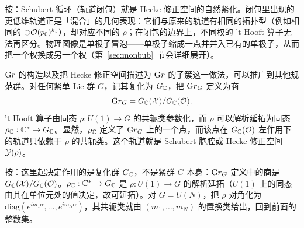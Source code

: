 \begin{yizhu}[物理图像]
按：Schubert 循环（轨道闭包）就是 Hecke 修正空间的自然紧化。闭包里出现的更低维轨道正是「混合」的几何表现：它们与原来的轨道有相同的拓扑型（例如相同的 $\oplus\cO(p_0)^{k_i}$），却对应不同的 $\rho$；在闭包的边界上，不同权的 't Hooft 算子无法再区分。物理图像是单极子冒泡——单极子缩成一点并并入已有的单极子，从而把一个权换成另一个权（第~\ref{sec:monbub}~节会详细展开）。
\end{yizhu}

${\rm Gr}$ 的构造以及把 Hecke 修正空间描述为 ${\rm Gr}$ 的子簇这一做法，可以推广到其他规范群。对任何紧单 Lie 群 $G$，记其复化为 $G_{\Bbb{C}}$，把 ${\rm Gr}_G$ 定义为商 %
\setcounter{equation}{33}
\begin{equation}\label{eq:hxonoh}
{\rm Gr}_G=G_{\Bbb{C}}({\cal
X})/G_{\Bbb{C}}(\cO).
\end{equation}
't Hooft 算子由同态 $\rho: U(1)\to G$ 的共轭类参数化，而 $\rho$ 可以解析延拓为同态 $\rho_\CC: \CC^*\to G_{\Bbb{C}}$。显然，$\rho_\CC$ 定义了 ${\rm Gr}_G$ 上的一个点，而该点在 $G_{\Bbb{C}}(\cO)$ 左作用下的轨道只依赖于 $\rho$ 的共轭类。这个轨道就是 Schubert 胞腔或 Hecke 修正空间 ${{\EUY}}(\rho)$。

\begin{yizhu}[易错点]
按：这里起决定作用的是复化群 $G_{\Bbb{C}}$，不是紧群 $G$ 本身：${\rm Gr}_G$ 定义中的商是 $G_{\Bbb{C}}({\cal X})/G_{\Bbb{C}}(\cO)$。$\rho_\CC:\CC^*\to G_{\Bbb{C}}$ 是 $\rho:U(1)\to G$ 的解析延拓（$U(1)$ 上的同态由其在单位元处的值决定，故可延拓）。对 $G=U(N)$，把 $\rho$ 对角化为 $\mathrm{diag}(e^{im_1\alpha},\ldots,e^{im_N\alpha})$，其共轭类就由 $(m_1,\ldots,m_N)$ 的置换类给出，回到前面的整数集。
\end{yizhu}
